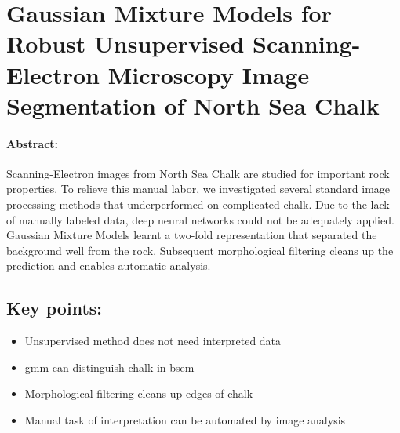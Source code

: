 \section[Gaussian Mixture Models for Robust Unsupervised Scanning-Electron Microscopy Image Segmentation of North Sea Chalk]{Gaussian Mixture Models for Robust Unsupervised Scanning-Electron Microscopy Image Segmentation of North Sea Chalk}
\label{section:gaussian}

\paragraph{Abstract:} Scanning-Electron images from North Sea Chalk are studied for important rock properties. To relieve this manual labor, we investigated several standard image processing methods that underperformed on complicated chalk. Due to the lack of manually labeled data, deep neural networks could not be adequately applied. Gaussian Mixture Models learnt a two-fold representation that separated the background well from the rock. Subsequent morphological filtering cleans up the prediction and enables automatic analysis. 
\vfill
\subsection*{Key points:}
\begin{itemize}
    \item Unsupervised method does not need interpreted data
    \item \acf{gmm} can distinguish chalk in \acf{bsem}
    \item Morphological filtering cleans up edges of chalk
    \item Manual task of interpretation can be automated by image analysis
\end{itemize}
\vfill
{\vfill\hfill\newline{}}

